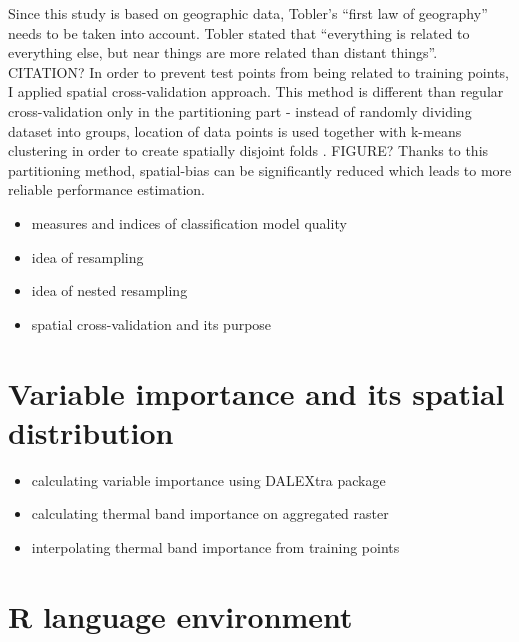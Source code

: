 \documentclass{amuthesis}
\begin{document}
Since this study is based on geographic data, Tobler's ``first law of
geography'' needs to be taken into account. Tobler stated that
``everything is related to everything else, but near things are more
related than distant things''. CITATION? In order to prevent test points
from being related to training points, I applied spatial
cross-validation approach. This method is different than regular
cross-validation only in the partitioning part - instead of randomly
dividing dataset into groups, location of data points is used together
with k-means clustering in order to create spatially disjoint folds
\autocite{lovelace_geocomputation_2019}. FIGURE? Thanks to this
partitioning method, spatial-bias can be significantly reduced which
leads to more reliable performance estimation.

\begin{itemize}
\item
  measures and indices of classification model quality
\item
  idea of resampling
\item
  idea of nested resampling
\item
  spatial cross-validation and its purpose
\end{itemize}

\hypertarget{variable-importance-and-its-spatial-distribution}{%
\section{Variable importance and its spatial
distribution}\label{variable-importance-and-its-spatial-distribution}}

\begin{itemize}
\item
  calculating variable importance using DALEXtra package
\item
  calculating thermal band importance on aggregated raster
\item
  interpolating thermal band importance from training points
\end{itemize}

\hypertarget{sec-r}{%
\section{R language environment}\label{sec-r}}
\end{document}
